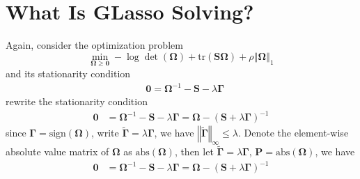 \documentclass[twoside]{article}
\begin{document}
\section{What Is GLasso Solving?}
Again, consider the optimization problem 
\begin{equation*}
    \min_{\boldsymbol{\Omega}\geq \mathbf{0}} -\log \det (\boldsymbol{\Omega}) + \mathrm{tr}(\mathbf{S}\boldsymbol{\Omega}) +\rho\left\Vert \boldsymbol{\Omega} \right\Vert _1 
\end{equation*}
and its stationarity condition
\begin{align*}
    &\mathbf{0} = \boldsymbol{\Omega}^{-1} - \mathbf{S} -\lambda \boldsymbol{\Gamma}
\end{align*}
rewrite the stationarity condition
\begin{align*}
    \mathbf{0} &= \boldsymbol{\Omega}^{-1} - \mathbf{S} -\lambda \boldsymbol{\Gamma} = \boldsymbol{\Omega} - \left(\mathbf{S}+ \lambda\boldsymbol{\Gamma}\right)^{-1}
\end{align*}
since $\boldsymbol{\Gamma}=\mathrm{sign}(\boldsymbol{\Omega})$, write $\tilde{\boldsymbol{\Gamma}}=\lambda \boldsymbol{\Gamma}$, we have $\left\Vert \tilde{\boldsymbol{\Gamma}} \right\Vert _{\infty}\leq \lambda$. Denote the element-wise absolute value matrix of $\boldsymbol{\Omega}$ as $\mathrm{abs}(\boldsymbol{\Omega})$, then let $\tilde{\boldsymbol{\Gamma}} = \lambda \boldsymbol{\Gamma}$, $\mathbf{P}=\mathrm{abs}(\boldsymbol{\Omega})$, we have 
\begin{align*}
    \mathbf{0} &= \boldsymbol{\Omega}^{-1} - \mathbf{S} -\lambda \boldsymbol{\Gamma} = \boldsymbol{\Omega} - \left(\mathbf{S}+ \lambda\boldsymbol{\Gamma}\right)^{-1}
\end{align*}
\end{document}
